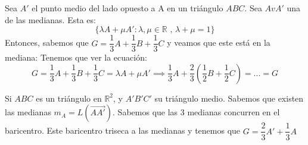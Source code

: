 \documentclass[11pt, a4paper, titlepage]{article}
\makeatletter
\renewenvironment{proof}[1][\proofname] {\vspace{-15pt}\par\pushQED{\qed}\normalfont\topsep6\p@\@plus6\p@\relax\trivlist\item[\hskip\labelsep\it#1\@addpunct{.}]\ignorespaces}{\popQED\endtrivlist\@endpefalse}
\newcommand{\R}{\mathbb{R}}
\theoremstyle{theorem-style}
\theoremstyle{definition-style}
\theoremstyle{remark-style}
\theoremstyle{example-style}
\makeatother
\begin{document}
	
	\begin{proof}
	Sea $A'$ el punto medio del lado opuesto a A en un triángulo $ABC$. Sea $AvA'$ una de las medianas. Esta es:
	\[
	\{\lambda A + \mu A': \lambda, \mu \in \R \text{ , } \lambda+\mu = 1\}
	\]
	Entonces, sabemos que $G = \dfrac{1}{3} A +  \dfrac{1}{3} B +  \dfrac{1}{3} C$ y veamos que este está en la mediana: Tenemos que ver la ecuación:
	\[
	G = \dfrac{1}{3} A +  \dfrac{1}{3} B +  \dfrac{1}{3} C = \lambda A + \mu A'  \implies \dfrac{1}{3}A + \dfrac{2}{3}(\dfrac{1}{2}B+\dfrac{1}{2}C) = ... = G
	\]

\end{proof}

Si $ABC$ es un triángulo en $\R^2$, y $A'B'C'$ su triángulo medio. Sabemos que existen las medianas $m_A = L(\vec{AA'})$. Sabemos que las 3 medianas concurren en el baricentro. Este baricentro triseca a las medianas y tenemos que $G = \dfrac{2}{3}A' + \dfrac{1}{3}A$
\end{document}
